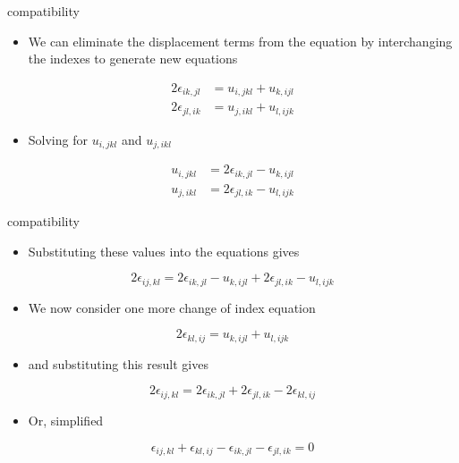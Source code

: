 \documentclass[
  letterpaper,
  ignorenonframetext,
  aspectratio=43,
  handout,
  12pt]{beamer}
\providecommand{\tightlist}{%
  \setlength{\itemsep}{0pt}\setlength{\parskip}{0pt}}
\providecommand{\tightlist}{%
\setlength{\itemsep}{0pt}\setlength{\parskip}{0pt}}
\begin{document}
\begin{frame}{compatibility}
\protect\hypertarget{compatibility-2}{}
\begin{itemize}
\tightlist
\item
  We can eliminate the displacement terms from the equation by
  interchanging the indexes to generate new equations
\end{itemize}

\[\begin{aligned}
    2\epsilon_{ik,jl} &= u_{i,jkl} + u_{k,ijl} \\
    2\epsilon_{jl,ik} &= u_{j,ikl} + u_{l,ijk}
\end{aligned}\]

\begin{itemize}
\tightlist
\item
  Solving for \(u_{i,jkl}\) and \(u_{j,ikl}\)
\end{itemize}

\[\begin{aligned}
    u_{i,jkl} &= 2\epsilon_{ik,jl} - u_{k,ijl} \\
    u_{j,ikl} &= 2\epsilon_{jl,ik} - u_{l,ijk}
\end{aligned}\]
\end{frame}

\begin{frame}{compatibility}
\protect\hypertarget{compatibility-3}{}
\begin{itemize}
\tightlist
\item
  Substituting these values into the equations gives
\end{itemize}

\[2\epsilon_{ij,kl} = 2\epsilon_{ik,jl} - u_{k,ijl} + 2\epsilon_{jl,ik} - u_{l, ijk}\]

\begin{itemize}
\tightlist
\item
  We now consider one more change of index equation
\end{itemize}

\[2\epsilon_{kl,ij} = u_{k,ijl} + u_{l,ijk}\]

\begin{itemize}
\tightlist
\item
  and substituting this result gives
\end{itemize}

\[2\epsilon_{ij,kl} = 2\epsilon_{ik,jl} + 2\epsilon_{jl,ik} - 2\epsilon_{kl,ij}\]

\begin{itemize}
\tightlist
\item
  Or, simplified
\end{itemize}

\[\epsilon_{ij,kl} + \epsilon_{kl,ij} - \epsilon_{ik,jl} - \epsilon_{jl,ik} = 0\]
\end{frame}
\end{document}
